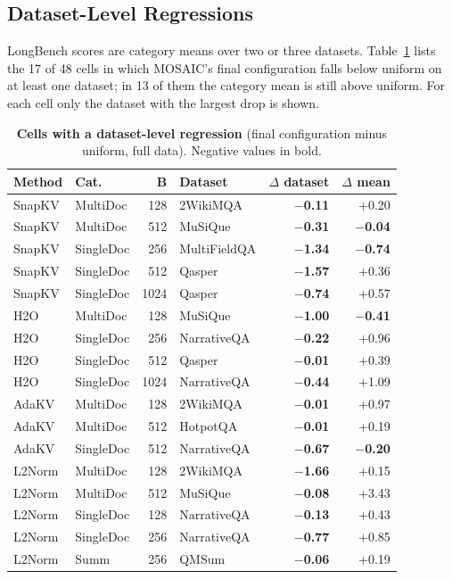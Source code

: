 \subsection{Dataset-Level Regressions}
\label{app:dataset-reg}

LongBench scores are category means over two or three datasets. Table~\ref{tab:app-dataset-reg} lists the 17 of 48 cells in which MOSAIC's final configuration falls below uniform on at least one dataset; in 13 of them the category mean is still above uniform. For each cell only the dataset with the largest drop is shown.

\begin{table}[t]
  \centering
  \scriptsize
  \setlength{\tabcolsep}{3pt}
  \begin{tabular}{@{}l l r l r r@{}}
    \toprule
    Method & Cat. & B & Dataset & $\Delta$ dataset & $\Delta$ mean \\
    \midrule
    SnapKV & MultiDoc & 128 & 2WikiMQA & \textbf{$-$0.11} & +0.20 \\
    SnapKV & MultiDoc & 512 & MuSiQue & \textbf{$-$0.31} & \textbf{$-$0.04} \\
    SnapKV & SingleDoc & 256 & MultiFieldQA & \textbf{$-$1.34} & \textbf{$-$0.74} \\
    SnapKV & SingleDoc & 512 & Qasper & \textbf{$-$1.57} & +0.36 \\
    SnapKV & SingleDoc & 1024 & Qasper & \textbf{$-$0.74} & +0.57 \\
    H2O & MultiDoc & 128 & MuSiQue & \textbf{$-$1.00} & \textbf{$-$0.41} \\
    H2O & SingleDoc & 256 & NarrativeQA & \textbf{$-$0.22} & +0.96 \\
    H2O & SingleDoc & 512 & Qasper & \textbf{$-$0.01} & +0.39 \\
    H2O & SingleDoc & 1024 & NarrativeQA & \textbf{$-$0.44} & +1.09 \\
    AdaKV & MultiDoc & 128 & 2WikiMQA & \textbf{$-$0.01} & +0.97 \\
    AdaKV & MultiDoc & 512 & HotpotQA & \textbf{$-$0.01} & +0.19 \\
    AdaKV & SingleDoc & 512 & NarrativeQA & \textbf{$-$0.67} & \textbf{$-$0.20} \\
    L2Norm & MultiDoc & 128 & 2WikiMQA & \textbf{$-$1.66} & +0.15 \\
    L2Norm & MultiDoc & 512 & MuSiQue & \textbf{$-$0.08} & +3.43 \\
    L2Norm & SingleDoc & 128 & NarrativeQA & \textbf{$-$0.13} & +0.43 \\
    L2Norm & SingleDoc & 256 & NarrativeQA & \textbf{$-$0.77} & +0.85 \\
    L2Norm & Summ & 256 & QMSum & \textbf{$-$0.06} & +0.19 \\
    \bottomrule
  \end{tabular}
  \caption{\textbf{Cells with a dataset-level regression} (final configuration minus uniform, full data). Negative values in bold.}
  \label{tab:app-dataset-reg}
\end{table}



